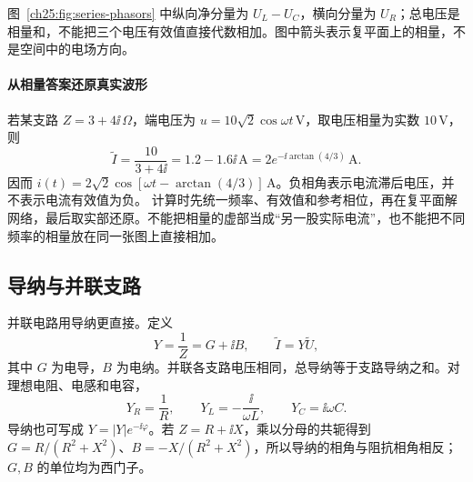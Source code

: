 \begin{center}
\begin{minipage}{0.78\linewidth}
\centering
{}
\label{ch25:fig:series-phasors}
\end{minipage}
\end{center}
图~\ref{ch25:fig:series-phasors} 中纵向净分量为 $U_L-U_C$，横向分量为 $U_R$；总电压是相量和，不能把三个电压有效值直接代数相加。图中箭头表示复平面上的相量，不是空间中的电场方向。


\paragraph{从相量答案还原真实波形}
若某支路 $Z=3+4\ii\,\Omega$，端电压为 $u=10\sqrt2\cos\omega t\,\mathrm V$，取电压相量为实数 $10\,\mathrm V$，则
\[
 \widetilde I=\frac{10}{3+4\ii}=1.2-1.6\ii\,\mathrm A
 =2e^{-\ii\arctan(4/3)}\,\mathrm A.
\]
因而 $i(t)=2\sqrt2\cos[\omega t-\arctan(4/3)]\,\mathrm A$。负相角表示电流滞后电压，并不表示电流有效值为负。
计算时先统一频率、有效值和参考相位，再在复平面解网络，最后取实部还原。不能把相量的虚部当成“另一股实际电流”，也不能把不同频率的相量放在同一张图上直接相加。


\subsection{导纳与并联支路}


并联电路用导纳更直接。定义
\begin{equation}
 Y=\frac1Z=G+\ii B,
 \qquad \widetilde I=Y\widetilde U,
\end{equation}
其中 $G$ 为电导，$B$ 为电纳。并联各支路电压相同，总导纳等于支路导纳之和。对理想电阻、电感和电容，
\begin{equation}
 Y_R=\frac1R,
 \qquad Y_L=-\frac{\ii}{\omega L},
 \qquad Y_C=\ii\omega C.
\end{equation}
导纳也可写成 $Y=|Y|e^{-\ii\varphi}$。若 $Z=R+\ii X$，乘以分母的共轭得到
$G=R/(R^2+X^2)$、$B=-X/(R^2+X^2)$，所以导纳的相角与阻抗相角相反；$G,B$ 的单位均为西门子。

